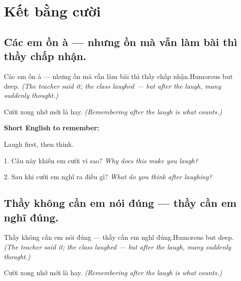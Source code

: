 \chapter{Kết bằng cười}


\section{Các em ồn à — nhưng ồn mà vẫn làm bài thì thầy chấp nhận.}
\begin{truyen}{Các em ồn à — nhưng ồn mà vẫn làm bài thì thầy chấp nhận.}{Humorous but deep.}
\textit{(The teacher said it; the class laughed — but after the laugh, many suddenly thought.)}
\end{truyen}

\begin{baihoc}
Cười xong nhớ mới là hay.
\textit{(Remembering after the laugh is what counts.)}
\end{baihoc}

\begin{ghinhoanh}
\textbf{Short English to remember:}

Laugh first, then think.

\end{ghinhoanh}

\begin{tuhocnhanh}
1. Câu này khiến em cười vì sao? \textit{Why does this make you laugh?}

2. Sau khi cười em nghĩ ra điều gì? \textit{What do you think after laughing?}
\end{tuhocnhanh}
\ngancach


\section{Thầy không cần em nói đúng — thầy cần em nghĩ đúng.}
\begin{truyen}{Thầy không cần em nói đúng — thầy cần em nghĩ đúng.}{Humorous but deep.}
\textit{(The teacher said it; the class laughed — but after the laugh, many suddenly thought.)}
\end{truyen}

\begin{baihoc}
Cười xong nhớ mới là hay.
\textit{(Remembering after the laugh is what counts.)}
\end{baihoc}

